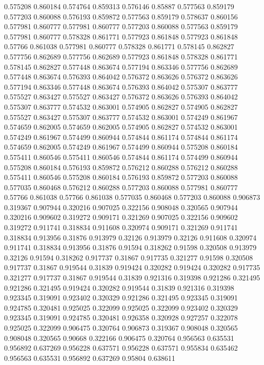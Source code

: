 0.575208 0.860184
0.574764 0.859313
0.576146 0.85887
0.577563 0.859179
0.577203 0.860088
0.576193 0.859872
0.577563 0.859179
0.578637 0.860156
0.577981 0.860777
0.577981 0.860777
0.577203 0.860088
0.577563 0.859179
0.577981 0.860777
0.578328 0.861771
0.577923 0.861848
0.577923 0.861848
0.57766 0.861038
0.577981 0.860777
0.578328 0.861771
0.578145 0.862827
0.577756 0.862689
0.577756 0.862689
0.577923 0.861848
0.578328 0.861771
0.578145 0.862827
0.577448 0.863674
0.577194 0.863346
0.577756 0.862689
0.577448 0.863674
0.576393 0.864042
0.576372 0.863626
0.576372 0.863626
0.577194 0.863346
0.577448 0.863674
0.576393 0.864042
0.575307 0.863777
0.575527 0.863427
0.575527 0.863427
0.576372 0.863626
0.576393 0.864042
0.575307 0.863777
0.574532 0.863001
0.574905 0.862827
0.574905 0.862827
0.575527 0.863427
0.575307 0.863777
0.574532 0.863001
0.574249 0.861967
0.574659 0.862005
0.574659 0.862005
0.574905 0.862827
0.574532 0.863001
0.574249 0.861967
0.574499 0.860944
0.574844 0.861174
0.574844 0.861174
0.574659 0.862005
0.574249 0.861967
0.574499 0.860944
0.575208 0.860184
0.575411 0.860546
0.575411 0.860546
0.574844 0.861174
0.574499 0.860944
0.575208 0.860184
0.576193 0.859872
0.576212 0.860288
0.576212 0.860288
0.575411 0.860546
0.575208 0.860184
0.576193 0.859872
0.577203 0.860088
0.577035 0.860468
0.576212 0.860288
0.577203 0.860088
0.577981 0.860777
0.57766 0.861038
0.57766 0.861038
0.577035 0.860468
0.577203 0.860088
0.906873 0.319367
0.907944 0.320216
0.907025 0.322156
0.908048 0.320565
0.907944 0.320216
0.909602 0.319272
0.909171 0.321269
0.907025 0.322156
0.909602 0.319272
0.911741 0.318834
0.911608 0.320974
0.909171 0.321269
0.911741 0.318834
0.913956 0.31876
0.913979 0.32126
0.913979 0.32126
0.911608 0.320974
0.911741 0.318834
0.913956 0.31876
0.91594 0.318262
0.91598 0.320508
0.913979 0.32126
0.91594 0.318262
0.917737 0.31867
0.917735 0.321277
0.91598 0.320508
0.917737 0.31867
0.919544 0.31839
0.919424 0.320282
0.919424 0.320282
0.917735 0.321277
0.917737 0.31867
0.919544 0.31839
0.921316 0.319398
0.921286 0.321495
0.921286 0.321495
0.919424 0.320282
0.919544 0.31839
0.921316 0.319398
0.923345 0.319091
0.923402 0.320329
0.921286 0.321495
0.923345 0.319091
0.924785 0.320481
0.925025 0.322099
0.925025 0.322099
0.923402 0.320329
0.923345 0.319091
0.924785 0.320481
0.926358 0.320928
0.927257 0.322078
0.925025 0.322099
0.906475 0.320764
0.906873 0.319367
0.908048 0.320565
0.908048 0.320565
0.90668 0.322166
0.906475 0.320764
0.956563 0.635531
0.956892 0.637269
0.956228 0.637571
0.956228 0.637571
0.955834 0.635462
0.956563 0.635531
0.956892 0.637269
0.95804 0.638611
